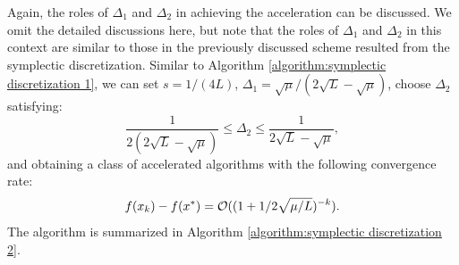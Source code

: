 \documentclass[11pt]{article}
\newcommand{\1}{\mathbf 1}
\numberwithin{equation}{section}
\begin{document}
Again, the roles of $\Delta_1$ and $\Delta_2$ in achieving the acceleration can be discussed. We omit the detailed discussions here, but note that the roles of $\Delta_1$ and $\Delta_2$ in this context are similar to those in the previously discussed scheme resulted from the symplectic discretization.
Similar to Algorithm \ref{algorithm:symplectic discretization 1}, we can set $s = 1/(4L)$, $\Delta_1 = {\sqrt{\mu}/(2\sqrt{L}-\sqrt{\mu})}$, choose $\Delta_2$ satisfying:
\begin{equation*}
	\frac{1}{2(2\sqrt{L}-\sqrt{\mu})}\leqslant \Delta_2 \leqslant \frac{1}{2\sqrt{L}-\sqrt{\mu}},
\end{equation*}
and obtaining a class of accelerated algorithms with the following convergence rate:
\[
f(x_k)-f(x^*)={\cal O}((1+1/2\sqrt{\mu/L})^{-k}).
\] 
The algorithm is summarized in Algorithm \ref{algorithm:symplectic discretization 2}. 


\begin{algorithm}
	\caption{Optimization algorithm derived from the modified symplectic Euler discretization}
	\label{algorithm:symplectic discretization 2}
	\begin{algorithmic}[1]
		\EndFor
	\end{algorithmic}
\end{algorithm}
\end{document}
